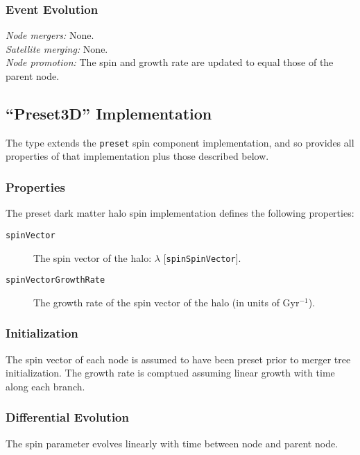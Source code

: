 \subsubsection{Event Evolution}

\noindent\emph{Node mergers:} None.\\

\noindent\emph{Satellite merging:} None.\\

\noindent\emph{Node promotion:} The spin and growth rate are updated to equal those of the parent node.\\

\subsection{``Preset3D'' Implementation}

The type extends the {\tt preset} spin component implementation, and so provides all properties of that implementation plus those described below.

\subsubsection{Properties}

The preset dark matter halo spin implementation defines the following properties:
\begin{description}
 \item [{\tt spinVector}] The spin vector of the halo: $\lambda$ [{\tt spinSpinVector}].
 \item [{\tt spinVectorGrowthRate}] The growth rate of the spin vector of the halo (in units of Gyr$^{-1}$).
\end{description}

\subsubsection{Initialization}

The spin vector of each \gls{node} is assumed to have been preset prior to merger tree initialization. The growth rate is comptued assuming linear growth with time along each branch.

\subsubsection{Differential Evolution}

The spin parameter evolves linearly with time between \gls{node} and parent node.

